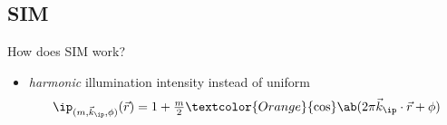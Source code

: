 
\subsection{\acf{SIM}}%



\begin{frame}{How does \acs{SIM} work?}
    \begin{itemize}
            \item \emph{harmonic} illumination intensity instead of uniform \pause
            \[
                \ip_{(m,\vec{k}_\ip,\phi)}(\vec{r}) = 1 + \tfrac{m}{2} \textcolor{Orange}{\cos}\ab(2\pi \vec{k}_\ip \cdot \vec{r} + \phi)
            \]
    \end{itemize}
\end{frame}

